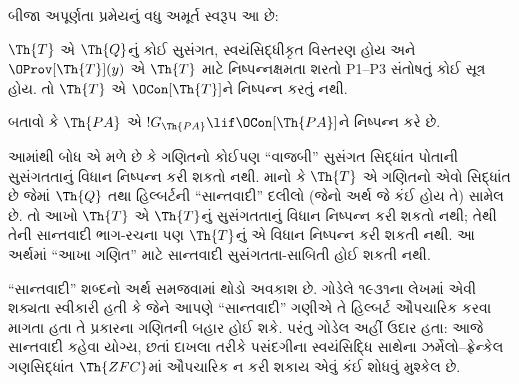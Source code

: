 બીજા અપૂર્ણતા પ્રમેયનું વધુ અમૂર્ત સ્વરૂપ આ છે:

\begin{thm}
$\Th{T}$ એ $\Th{Q}$નું કોઈ સુસંગત, સ્વયંસિદ્ધીકૃત વિસ્તરણ હોય અને $\OProv[\Th{T}](y)$ એ $\Th{T}$ માટે નિષ્પન્નક્ષમતા શરતો P1--P3 સંતોષતું કોઈ સૂત્ર હોય. તો $\Th{T}$ એ $\OCon[\Th{T}]$ને નિષ્પન્ન કરતું નથી.
\end{thm}

\begin{prob}
બતાવો કે $\Th{PA}$ એ $!G_{\Th{PA}} \lif \OCon[\Th{PA}]$ને નિષ્પન્ન કરે છે.
\end{prob}

\begin{digress}
આમાંથી બોધ એ મળે છે કે ગણિતનો કોઈપણ ``વાજબી'' સુસંગત સિદ્ધાંત પોતાની સુસંગતતાનું વિધાન નિષ્પન્ન કરી શકતો નથી. માનો કે $\Th{T}$ એ ગણિતનો એવો સિદ્ધાંત છે જેમાં $\Th{Q}$ તથા હિલ્બર્ટની ``સાન્તવાદી'' દલીલો (જેનો અર્થ જે કંઈ હોય તે) સામેલ છે. તો આખો $\Th{T}$ એ $\Th{T}$નું સુસંગતતાનું વિધાન નિષ્પન્ન કરી શકતો નથી; તેથી તેની સાન્તવાદી ભાગ-રચના પણ $\Th{T}$નું એ વિધાન નિષ્પન્ન કરી શકતી નથી. આ અર્થમાં ``આખા ગણિત'' માટે સાન્તવાદી સુસંગતતા-સાબિતી હોઈ શકતી નથી.

``સાન્તવાદી'' શબ્દનો અર્થ સમજવામાં થોડો અવકાશ છે. ગોડેલે ૧૯૩૧ના લેખમાં એવી શક્યતા સ્વીકારી હતી કે જેને આપણે ``સાન્તવાદી'' ગણીએ તે હિલ્બર્ટ ઔપચારિક કરવા માગતા હતા તે પ્રકારના ગણિતની બહાર હોઈ શકે. પરંતુ ગોડેલ અહીં ઉદાર હતા: આજે સાન્તવાદી કહેવા યોગ્ય, છતાં દાખલા તરીકે પસંદગીના સ્વયંસિદ્ધિ સાથેના ઝર્મેલો--ફ્રેન્કેલ ગણસિદ્ધાંત $\Th{ZFC}$માં ઔપચારિક ન કરી શકાય એવું કંઈ શોધવું મુશ્કેલ છે.
\end{digress}
\endgroup


\begingroup
\makeatletter{}\makeatother


\label{guunit:OLP-0320}


